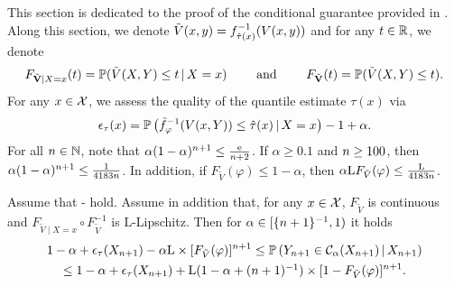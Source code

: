 
This section is dedicated to the proof of the conditional guarantee provided in . Along this section, we denote $\tilde{V}(x,y)=f_{\hat{\tau}(x)}^{-1}(V(x,y))$ and for any $t\in\mathbb{R}$, we denote
\begin{equation*}
  F_{\tilde{\mathbf{V}}\mid X=x}(t)
  = \mathbb{P}({\tilde{V}(X,Y)\le t \,\vert\, X=x})
  \qquad\text{ and }\qquad
  F_{\tilde{\mathbf{V}}}(t) = \mathbb{P}({\tilde{V}(X,Y)\le t}).
\end{equation*}
%
For any $x\in\mathcal{X}$, we assess the quality of the quantile estimate $\tau(x)$ via
\begin{equation*}
  \epsilon_{\tau}(x)
  = \mathbb{P}\left({\tilde{f}_{\varphi}^{-1}(V(x,Y))\le \hat{\tau}(x) \,\vert\, X=x}\right) - 1 + \alpha.
\end{equation*}
%
For all $n\in\mathbb{N}$, note that $\alpha (1-\alpha)^{n+1}\le \frac{\mathrm{e}}{n+2}$.
If $\alpha\ge 0.1$ and $n\ge 100$, then $\alpha (1-\alpha)^{n+1}\le \frac{1}{4183n}$.
In addition, if $F_{\tilde{V}}(\varphi)\le 1-\alpha$, then $\alpha \mathrm{L} F_{\tilde{V}}(\varphi) \le \frac{\mathrm{L}}{4183n}$.

\begin{theorem}  
  Assume that - hold.  Assume in addition that, for any $x \in \mathcal{X}$, $F_{\tilde{V}}$ is continuous and $F_{\tilde{V}\mid X=x}\circ F_{\tilde{V}}^{-1}$ is $\mathrm{L}$-Lipschitz. Then for $\alpha\in[\{n+1\}^{-1},1)$ it holds
  \begin{multline*}
    1 - \alpha + \epsilon_{\tau}(X_{n+1})
    - \alpha \mathrm{L} \times [{F_{\tilde{V}}(\varphi)}]^{n+1}
    \le \mathbb{P}\left({Y_{n+1}\in \mathcal{C}_{\alpha}(X_{n+1}) \,\vert\, X_{n+1}}\right)
    \\
    \le 1 - \alpha + \epsilon_{\tau}(X_{n+1})
    + \mathrm{L} ({\textstyle{1 - \alpha + (n+1)^{-1}}}) \times [{1 - F_{\tilde{V}}(\varphi)}]^{n+1}.
  \end{multline*}
\end{theorem}

